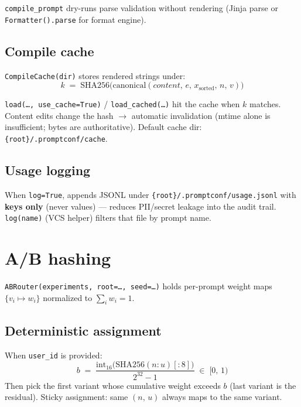 \documentclass[11pt,a4paper]{article}
\newcommand{\code}[1]{\texttt{#1}}
\begin{document}
\code{compile\_prompt} dry-runs parse validation without rendering (Jinja parse
or \code{Formatter().parse} for format engine).

\subsection{Compile cache}
\label{sec:cache}

\code{CompileCache(dir)} stores rendered strings under:
\begin{equation}
  k \;=\; \mathrm{SHA256}\!\bigl(
    \mathrm{canonical}(
      \textit{content},\, e,\, x_{\mathrm{sorted}},\, n,\, v
    )
  \bigr)
\end{equation}

\code{load(\ldots, use\_cache=True)} / \code{load\_cached(\ldots)} hit the cache
when $k$ matches. Content edits change the hash $\rightarrow$ automatic
invalidation (mtime alone is insufficient; bytes are authoritative). Default
cache dir: \code{\{root\}/.promptconf/cache}.

\subsection{Usage logging}

When \code{log=True}, appends JSONL under
\code{\{root\}/.promptconf/usage.jsonl} with \textbf{keys only} (never values)
--- reduces PII/secret leakage into the audit trail. \code{log(name)} (VCS
helper) filters that file by prompt name.

\section{A/B hashing}
\label{sec:ab}

\code{ABRouter(experiments, root=\ldots, seed=\ldots)} holds per-prompt weight
maps $\{v_i \mapsto w_i\}$ normalized to $\sum_i w_i = 1$.

\subsection{Deterministic assignment}

When \code{user\_id} is provided:
\begin{equation}
  b \;=\;
  \frac{\mathrm{int}_{16}\!\bigl(\mathrm{SHA256}(n{:}u)[:8]\bigr)}
       {2^{32}-1}
  \;\in\; [0,\,1)
\end{equation}
Then pick the first variant whose cumulative weight exceeds $b$ (last variant
is the residual). Sticky assignment: same $(n,\, u)$ always maps to the same
variant.
\end{document}
